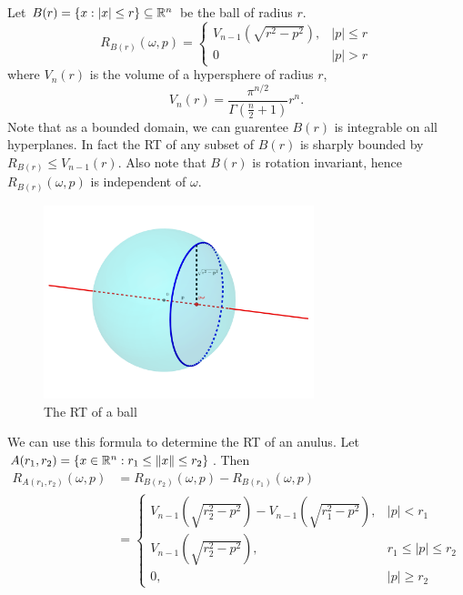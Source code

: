\begin{myexample}
  Let $B(r) = \{x : |x| \leq r\} \subseteq \mathbb{R}^n$ be the ball of radius $r$.
  \[
    R_{B(r)}(\omega, p) = 
    \begin{cases}
      V_{n-1}\left(\sqrt{r^2 - p^2}\right), & |p| \leq r \\
      0 & |p| > r
    \end{cases}    
  \]
  where $V_n(r)$ is the volume of a hypersphere of radius $r$,
  \[
    V_n(r) = \frac{\pi^{n/2}}{\Gamma(\frac n2+1)} r^n.
  \]
  Note that as a bounded domain, we can guarentee $B(r)$ is integrable on all hyperplanes. In fact the RT of any subset of $B(r)$ is sharply bounded by $R_{B(r)} \leq V_{n-1}(r)$. Also note that $B(r)$ is rotation invariant, hence $R_{B(r)}(\omega, p)$ is independent of $\omega$.
  
  \begin{figure}[h]
    \centering
    \includegraphics[width=0.7\textwidth]{Images/Ball RT.png}
    \caption{The RT of a ball}\label{fig:RTBall}
  \end{figure}

  We can use this formula to determine the RT of an anulus. Let $A(r_1, r_2) = \{x \in \mathbb{R}^n: r_1 \leq \|x\| \leq r_2\}$. Then
  \begin{align*}
    R_{A(r_1, r_2)}(\omega, p) 
    &= R_{B(r_2)}(\omega, p) - R_{B(r_1)}(\omega, p) \\
    &= 
    \begin{cases}
      V_{n-1}(\sqrt{r_2^2 - p^2}) - V_{n-1}(\sqrt{r_1^2 - p^2}), & |p| < r_1 \\
      V_{n-1}(\sqrt{r_2^2 - p^2}), & r_1 \leq |p| \leq r_2 \\
      0, & |p| \geq r_2
    \end{cases}
  \end{align*}
\end{myexample}
 


